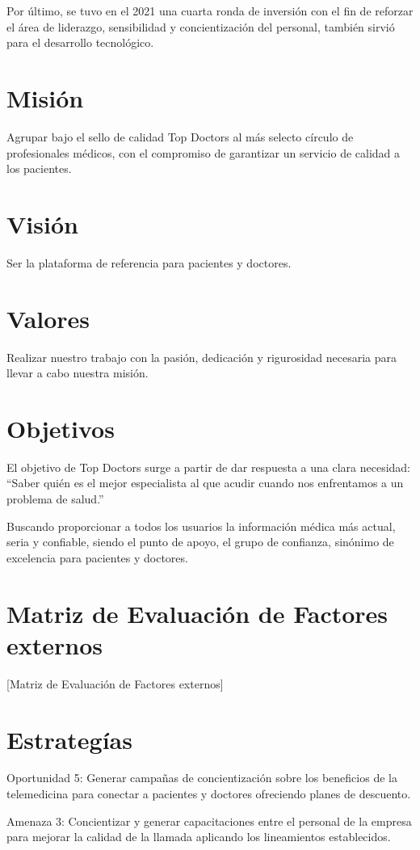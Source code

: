 Por último, se tuvo en el 2021 una cuarta ronda de inversión con el fin de reforzar el área de liderazgo, sensibilidad y concientización del personal, también sirvió para el desarrollo tecnológico.

\section{Misión}
Agrupar bajo el sello de calidad Top Doctors al más selecto círculo de profesionales médicos, con el compromiso de garantizar un servicio de calidad a los pacientes.

\section{Visión}
Ser la plataforma de referencia para pacientes y doctores.

\section{Valores}
Realizar nuestro trabajo con la pasión, dedicación y rigurosidad necesaria para llevar a cabo nuestra misión.

\section{Objetivos}
El objetivo de Top Doctors surge a partir de dar respuesta a una clara necesidad: “Saber quién es el mejor especialista al que acudir cuando nos enfrentamos a un problema de salud.”

Buscando proporcionar a todos los usuarios la información médica más actual, seria y confiable, siendo el punto de apoyo, el grupo de confianza, sinónimo de excelencia para pacientes y doctores.

\section{Matriz de Evaluación de Factores externos}
[Matriz de Evaluación de Factores externos]

\section{Estrategías}
Oportunidad 5: Generar campañas de concientización sobre los beneficios de la telemedicina para conectar a pacientes y doctores ofreciendo planes de descuento.

Amenaza 3: Concientizar y generar capacitaciones entre el personal de la empresa para mejorar la calidad de la llamada aplicando los lineamientos establecidos.
